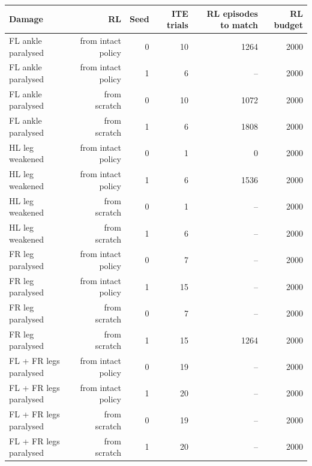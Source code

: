 \begin{tabular}{lrrrrr}
\toprule
Damage & RL & Seed & ITE trials & RL episodes to match & RL budget \\
\midrule
FL ankle paralysed & from intact policy & 0 & 10 & 1264 & 2000 \\
FL ankle paralysed & from intact policy & 1 & 6 & -- & 2000 \\
FL ankle paralysed & from scratch & 0 & 10 & 1072 & 2000 \\
FL ankle paralysed & from scratch & 1 & 6 & 1808 & 2000 \\
HL leg weakened & from intact policy & 0 & 1 & 0 & 2000 \\
HL leg weakened & from intact policy & 1 & 6 & 1536 & 2000 \\
HL leg weakened & from scratch & 0 & 1 & -- & 2000 \\
HL leg weakened & from scratch & 1 & 6 & -- & 2000 \\
FR leg paralysed & from intact policy & 0 & 7 & -- & 2000 \\
FR leg paralysed & from intact policy & 1 & 15 & -- & 2000 \\
FR leg paralysed & from scratch & 0 & 7 & -- & 2000 \\
FR leg paralysed & from scratch & 1 & 15 & 1264 & 2000 \\
FL + FR legs paralysed & from intact policy & 0 & 19 & -- & 2000 \\
FL + FR legs paralysed & from intact policy & 1 & 20 & -- & 2000 \\
FL + FR legs paralysed & from scratch & 0 & 19 & -- & 2000 \\
FL + FR legs paralysed & from scratch & 1 & 20 & -- & 2000 \\
\bottomrule
\end{tabular}
